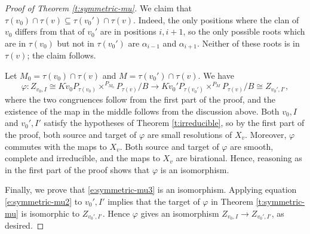 \documentclass[10pt,a4paper]{amsart}
\newcommand{\ga}{\alpha}
\begin{document}
\begin{proof}[Proof of Theorem \ref{t:symmetric-mu}]
We claim that $\tau(v_0) \cap \tau(v) \subseteq \tau(v_0') \cap \tau(v)$. Indeed, the only positions where
the clan of $v_0$ differs from that of $v_0'$ are in positions $i, i+1$, so
the only possible roots which are in $\tau(v_0)$ but not in $\tau(v_0')$
are $\ga_{i-1}$ and $\ga_{i+1}$.  Neither of these roots is in $\tau(v)$; the claim follows.

Let $M_0 = \tau(v_0) \cap \tau(v)$ and $M = \tau(v_0') \cap \tau(v)$.  We have
$$
\varphi:  Z_{v_0, I} \cong K \dot{v}_0 P_{\tau(v_0)} \times^{P_{M_0}} P_{\tau(v)}/B \to K \dot{v}_0' P_{\tau(v_0')} \times^{P_{M}} P_{\tau(v)}/B \cong Z_{v_0', I'},
$$
where the two congruences follow from the first part of the proof, and the existence of the map
in the middle follows from the discussion above.
Both $v_0, I$ and $v_0', I'$ satisfy the hypotheses of Theorem \ref{t:irreducible}, so by the first part of the proof,
both source and target of $\varphi$ are small resolutions of $X_v$.  Moreover, $\varphi$
commutes with the maps to $X_v$.   Both source and target of $\varphi$
are smooth, complete and irreducible, and the maps to $X_v$ are birational.
Hence, reasoning as in the first part of the proof
shows that $\varphi$ is an isomorphism.  

Finally, we prove that \eqref{e:symmetric-mu3} is an isomorphism.  Applying equation \eqref{e:symmetric-mu2}
to $v_0', I'$ implies
that the target of $\varphi$ in Theorem \ref{t:symmetric-mu}
is isomorphic to $Z_{v_0', I'}$.  Hence $\varphi$ gives an isomorphism
$Z_{v_0,I} \to Z_{v_0', I'}$, as desired. 
\end{proof}
\end{document}
